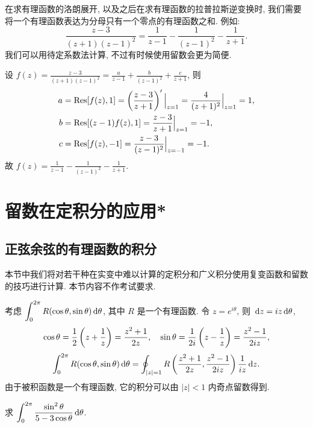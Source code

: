 在求有理函数的洛朗展开, 以及之后在求有理函数的拉普拉斯逆变换时, 我们需要将一个有理函数表达为分母只有一个零点的有理函数之和.
例如:
\[\frac{z-3}{(z+1)(z-1)^2}=\frac1{z-1}-\frac1{(z-1)^2}-\frac1{z+1}.\]
我们可以用待定系数法计算, 不过有时候使用留数会更为简便.

\begin{solution}
		设 $\displaystyle f(z)=\frac{z-3}{(z+1)(z-1)^2}=\frac a{z-1}+\frac b{(z-1)^2}+\frac c{z+1}$,
	{则
		\begin{align*}
			a&={\mathrm{Res}}[f(z),1]=\left(\frac{z-3}{z+1}\right)'\Big|_{z=1}=\frac 4{(z+1)^2}\Big|_{z=1}=1,\\
			b&={\mathrm{Res}}[(z-1)f(z),1]=\frac{z-3}{z+1}\Big|_{z=1}=-1,\\
			c&={\mathrm{Res}}[f(z),-1]=\frac{z-3}{(z-1)^2}\Big|_{z=-1}=-1.
		\end{align*}故 $\displaystyle f(z)=\frac1{z-1}-\frac1{(z-1)^2}-\frac1{z+1}$.
	}
\end{solution}

\section{留数在定积分的应用*}

\subsection{正弦余弦的有理函数的积分}

本节中我们将对若干种在实变中难以计算的定积分和广义积分使用复变函数和留数的技巧进行计算.
本节内容不作考试要求.

考虑 $\displaystyle\int_0^{2\pi} R(\cos\theta,\sin\theta)\,\mathrm{d}\theta$, 其中 $R$ 是一个有理函数.
令 $z=e^{i\theta}$, 则 $\,\mathrm{d} z=iz\,\mathrm{d}\theta$,
\[\cos\theta=\frac{1}{2}\left(z+\frac1z\right)=\frac{z^2+1}{2z},\quad
\sin\theta=\frac1{2i}\left(z-\frac1z\right)=\frac{z^2-1}{2iz},\]
	\[\int_0^{2\pi} R(\cos\theta,\sin\theta)\,\mathrm{d}\theta
	=\oint_{|z|=1} R\left(\frac{z^2+1}{2z},\frac{z^2-1}{2iz}\right)\frac1{iz}\,\mathrm{d} z.\]
由于被积函数是一个有理函数, 它的积分可以由 $|z|<1$ 内奇点留数得到.

\begin{example}
	求 $\displaystyle\int_0^{2\pi}\frac{\sin^2\theta}{5-3\cos\theta}\,\mathrm{d}\theta$.
\end{example}

